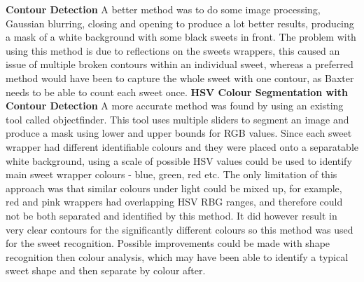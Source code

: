 %
\newline
\newline
\textbf{Contour Detection}
\newline
A better method was to do some image processing, Gaussian blurring, closing and opening to produce a lot better results, producing a mask of a white background with some black sweets in front. The problem with using this method is due to reflections on the sweets wrappers, this caused an issue of multiple broken contours within an individual sweet, whereas a preferred method would have been to capture the whole sweet with one contour, as Baxter needs to be able to count each sweet once.
\newline
\newline
\textbf{HSV Colour Segmentation with Contour Detection}
\newline
%
A more accurate method was found by using an existing tool called objectfinder. This tool uses multiple sliders to segment an image and produce a mask using lower and upper bounds for RGB values. Since each sweet wrapper had different identifiable colours and they were placed onto a separatable white background, using a scale of possible HSV values could be used to identify main sweet wrapper colours - blue, green, red etc. The only limitation of this approach was that similar colours under light could be mixed up, for example, red and pink wrappers had overlapping HSV RBG ranges, and therefore could not be both separated and identified by this method. It did however result in very clear contours for the significantly different colours so this method was used for the sweet recognition. Possible improvements could be made with shape recognition then colour analysis, which may have been able to identify a typical sweet shape and then separate by colour after.
